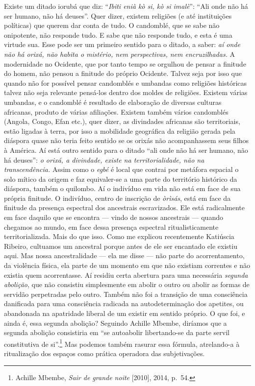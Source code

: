 Existe um ditado iorubá que diz: ``\textit{Ibiti enià kò si, kò si
imalè}'': ``Ali onde não há ser humano, não há deuses''. Quer dizer,
existem religiões (e até instituições políticas) que querem dar conta de
tudo. O candomblé, que se sabe não onipotente, não responde tudo. E sabe
que não responde tudo, e esta é uma virtude sua. Esse pode ser um
primeiro sentido para o ditado, a saber: \textit{aí onde não há orixá, não
habita o mistério, nem perspectivas, nem encruzilhadas.} A modernidade
no Ocidente, que por tanto tempo se orgulhou de pensar a finitude do
homem, não pensou a finitude do próprio Ocidente. Talvez seja por isso
que quando não for possível pensar candomblés e umbandas como religiões
históricas talvez não seja relevante pensá-los dentro dos moldes de
religiões. Existem várias umbandas, e o candomblé é resultado de
elaboração de diversas culturas africanas, produto de várias afiliações.
Existem também vários candomblés (Angola, Congo, Efan etc.), quer dizer,
as divindades africanas são territoriais, estão ligadas à terra, por
isso a mobilidade geográfica da religião gerada pela diáspora quase não
teria feito sentido se os orixás não acompanhassem seus filhos à
América. Aí está outro sentido para o ditado ``ali onde não há ser
humano, não há deuses'': \textit{o orixá, a divindade, existe na
territorialidade, não na transcendência.} Assim como o \textit{egbé} é
local que contrai por metáfora espacial o solo mítico da origem e faz
equivaler-se a uma parte do território histórico da diáspora, também o
quilombo. Aí o indivíduo em vida não está em face de sua própria
finitude. O indivíduo, centro de inscrição de \textit{òrìsás}, está em
face da finitude da presença espectral dos ancestrais escravizados. Ele
está radicalmente em face daquilo que se encontra --- vindo de nossos
ancestrais --- quando chegamos ao mundo, em face dessa presença espectral
ritualisticamente territorializada. Mais do que isso. Como me explicou
recentemente Katiúscia Ribeiro, cultuamos um ancestral porque antes de
ele ser encantado ele existiu aqui. Mas nossa ancestralidade --- ela me
disse --- não parte do acorrentamento, da violência física, ela parte de
um momento em que não existiam correntes e não existia quem
acorrentasse. Aí residiu certa abertura para uma necessária
\textit{segunda abolição}, que não consistiu simplesmente em abolir o
outro ou abolir as formas de servidão perpetradas pelo outro. Também não
foi a transição de uma consciência danificada para uma consciência
radicada na autodeterminação dos apetites, ou abandonada na apatridade
liberal de um existir em sentido próprio. O que foi, e ainda é, essa
segunda abolição? Seguindo Achille Mbembe, diríamos que a segunda
abolição consistiria em ``se autoabolir libertando-se da parte servil
constitutiva de si''.\footnote{Achille Mbembe, \textit{Sair de grande
  noite} {[}2010{]}, 2014, p.~54.} Mas podemos também rasurar essa
fórmula, atrelando-a à ritualização dos espaços como prática operadora
das subjetivações.


